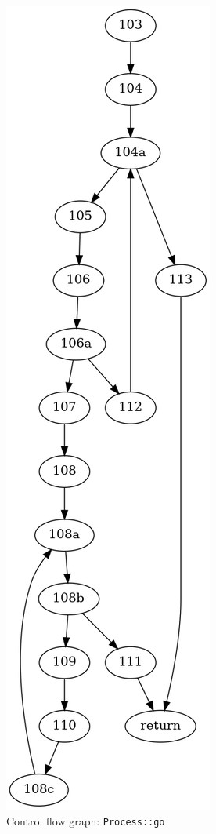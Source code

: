 \documentclass[12pts]{report}
\begin{document}
\begin{figure}
\begin{center}
\includegraphics[height=0.8\textheight]{images/go-cfg.png}
\end{center}
\caption{Control flow graph: \lstinline[style=jc]|Process::go|}
\label{f:cfg}
\end{figure}
\end{document}
